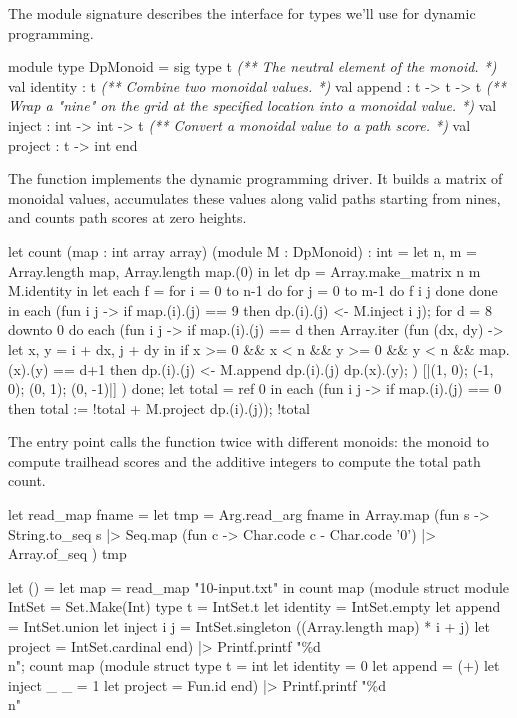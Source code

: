 \documentclass{article}
\begin{document}
The  module signature describes the interface for types we’ll use for dynamic programming.

\begin{code}[ocaml]
module type DpMonoid = sig
  type t
  \emph{(** The neutral element of the monoid. *)}
  val identity : t
  \emph{(** Combine two monoidal values. *)}
  val append : t -> t -> t
  \emph{(** Wrap a "nine" on the grid at the specified location into a monoidal value. *)}
  val inject : int -> int -> t
  \emph{(** Convert a monoidal value to a path score. *)}
  val project : t -> int
end
\end{code}


The  function implements the dynamic programming driver.
It builds a matrix of monoidal values,
accumulates these values along valid paths starting from nines,
and counts path scores at zero heights.

\begin{code}[ocaml]
let count (map : int array array) (module M : DpMonoid) : int =
  let n, m = Array.length map, Array.length map.(0) in
  let dp = Array.make_matrix n m M.identity in
  let each f = for i = 0 to n-1 do for j = 0 to m-1 do f i j done done in
  each (fun i j -> if map.(i).(j) == 9 then dp.(i).(j) <- M.inject i j);
  for d = 8 downto 0 do
    each (fun i j -> if map.(i).(j) == d then
                       Array.iter (fun (dx, dy) ->
                           let x, y = i + dx, j + dy in
                           if x >= 0 && x < n && y >= 0 && y < n
                              && map.(x).(y) == d+1 then
                             dp.(i).(j) <- M.append dp.(i).(j) dp.(x).(y);
                         ) [|(1, 0); (-1, 0); (0, 1); (0, -1)|]
      )
  done;
  let total = ref 0 in
  each (fun i j -> if map.(i).(j) == 0 then total := !total + M.project dp.(i).(j));
  !total
\end{code}


The entry point calls the  function twice with different monoids:
the  monoid to compute trailhead scores and the additive integers to compute the total path count.

\begin{code}[ocaml]
let read_map fname =
  let tmp = Arg.read_arg fname in
  Array.map (fun s ->
      String.to_seq s
      |> Seq.map (fun c -> Char.code c - Char.code '0')
      |> Array.of_seq
    ) tmp

let () =
  let map = read_map "10-input.txt" in
  count map (module struct
               module IntSet = Set.Make(Int)
               type t = IntSet.t
               let identity = IntSet.empty
               let append = IntSet.union
               let inject i j = IntSet.singleton ((Array.length map) * i + j)
               let project = IntSet.cardinal
             end)
  |> Printf.printf "\%d\\n";
  count map (module struct
               type t = int
               let identity = 0
               let append = (+)
               let inject _ _ = 1
               let project = Fun.id
             end)
  |> Printf.printf "\%d\\n"
\end{code}
\end{document}
